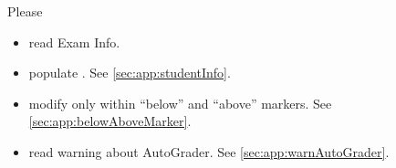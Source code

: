 
\begin{hBoxWarning}
Please
\begin{itemize}
	
	\item 
	read  Exam Info.
	
	\item
	populate \hStudentInfo.
	See \ref{sec:app:studentInfo}.
	
	\item
	modify only within ``below'' and ``above'' markers.
	See \ref{sec:app:belowAboveMarker}.

	\item
	read warning about AutoGrader.
	See \ref{sec:app:warnAutoGrader}.
	
\end{itemize}
\end{hBoxWarning}
